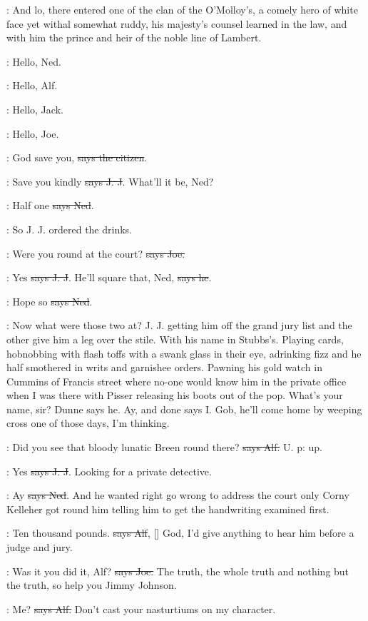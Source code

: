 :
And lo, there entered one of the clan of the O'Molloy's, a comely hero
of white face yet withal somewhat ruddy, his majesty's counsel learned in
the law,
and with him the prince and heir of the noble line of Lambert.

\bergan:
Hello, Ned.

\lambert:
Hello, Alf.

\joe:
Hello, Jack.

\jjom:
Hello, Joe.

\citizen:
God save you, \sout{says the citizen}.

\jjom:
Save you kindly \sout{says J. J}.
What'll it be, Ned?

\lambert:
Half one \sout{says Ned}.

\Nq:
So J. J. ordered the drinks.

\joe:
Were you round at the court? \sout{says Joe.}

\jjom:
Yes \sout{says J. J}.
He'll square that, Ned, \sout{says he}.

\lambert:
Hope so \sout{says Ned}.

\Nq:
Now what were those two at? J. J. getting him off the grand jury list
and the other give him a leg over the stile. With his name in Stubbs's.
Playing cards, hobnobbing with flash toffs with a swank glass in their
eye, adrinking fizz and he half smothered in writs and garnishee orders.
Pawning his gold watch in Cummins of Francis street where no-one would
know him in the private office when I was there with Pisser releasing his
boots out of the pop. What's your name, sir? Dunne says he. Ay, and done
says I. Gob, he'll come home by weeping cross one of those days, I'm
thinking.%

\bergan:
Did you see that bloody lunatic Breen round there?
\sout{says Alf.} U. p: up.

\jjom:
Yes \sout{says J. J}.
Looking for a private detective.

\lambert:
Ay \sout{says Ned}.
And he wanted right go wrong to address the court only
Corny Kelleher got round him telling him to get the handwriting examined
first.

\bergan:
Ten thousand pounds. \sout{says Alf},
[]
God, I'd give anything to hear
him before a judge and jury.

\joe:
Was it you did it, Alf? \sout{says Joe.}
The truth, the whole truth and nothing
but the truth, so help you Jimmy Johnson.

\bergan:
Me? \sout{says Alf.}
Don't cast your nasturtiums on my character.

